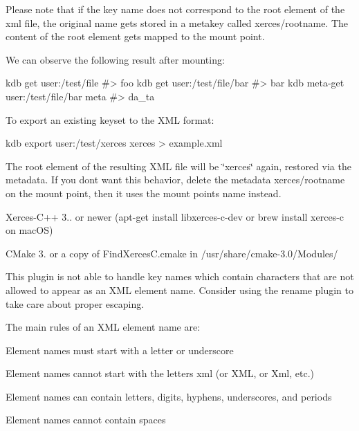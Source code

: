 Please note that if the key name does not correspond to the root element of the xml file, the original name gets stored in a metakey called {\ttfamily xerces/rootname}. The content of the root element gets mapped to the mount point.

We can observe the following result after mounting\+:


\begin{DoxyCode}
kdb get user:/test/file
#> foo
kdb get user:/test/file/bar
#> bar
kdb meta-get user:/test/file/bar meta
#> da\_ta
\end{DoxyCode}


To export an existing keyset to the X\+ML format\+:


\begin{DoxyCode}
kdb export user:/test/xerces xerces > example.xml
\end{DoxyCode}


The root element of the resulting X\+ML file will be \char`\"{}xerces\char`\"{} again, restored via the metadata. If you don\textquotesingle{}t want this behavior, delete the metadata {\ttfamily xerces/rootname} on the mount point, then it uses the mount point\textquotesingle{}s name instead.


\begin{DoxyItemize}
\item {\ttfamily Xerces-\/\+C++ 3..} or newer ({\ttfamily apt-\/get install libxerces-\/c-\/dev} or {\ttfamily brew install xerces-\/c} on mac\+OS)
\item C\+Make 3. or a copy of {\ttfamily Find\+Xerces\+C.\+cmake} in {\ttfamily /usr/share/cmake-\/3.0/\+Modules/}
\end{DoxyItemize}

This plugin is not able to handle key names which contain characters that are not allowed to appear as an X\+ML element name. Consider using the rename plugin to take care about proper escaping.

The main rules of an X\+ML element name are\+:


\begin{DoxyItemize}
\item Element names must start with a letter or underscore
\item Element names cannot start with the letters xml (or X\+ML, or Xml, etc.)
\item Element names can contain letters, digits, hyphens, underscores, and periods
\item Element names cannot contain spaces
\end{DoxyItemize}

